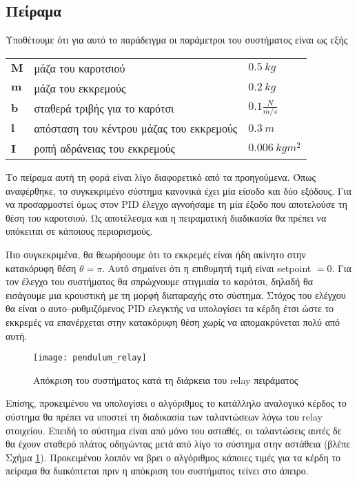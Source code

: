 \subsection{Πείραμα}

Υποθέτουμε ότι για αυτό το παράδειγμα οι παράμετροι του συστήματος είναι ως εξής
\begin{flushleft}
\begin{tabular}{lll}
$\mathbf{M}$ & μάζα του καροτσιού & $0.5\ kg$ \\  
$\mathbf{m}$ & μάζα του εκκρεμούς & $0.2\ kg$ \\ 
$\mathbf{b}$ & σταθερά τριβής για το καρότσι & $0.1 \frac{N}{m/s}$ \\ 
$\mathbf{l}$ & απόσταση του κέντρου μάζας του εκκρεμούς & $0.3\ m$ \\ 
$\mathbf{I}$ & ροπή αδράνειας του εκκρεμούς & $0.006\ kgm^2$ \\ 
\end{tabular}
\end{flushleft}
 
Το πείραμα αυτή τη φορά είναι λίγο διαφορετικό από τα προηγούμενα. Όπως αναφέρθηκε, το συγκεκριμένο σύστημα κανονικά έχει μία είσοδο και δύο εξόδους. Για να προσαρμοστεί όμως στον PID έλεγχο αγνοήσαμε τη μία έξοδο που αποτελούσε τη θέση του καροτσιού. Ως αποτέλεσμα και η πειραματική διαδικασία θα πρέπει να υπόκειται σε κάποιους περιορισμούς.

Πιο συγκεκριμένα, θα θεωρήσουμε ότι το εκκρεμές είναι ήδη ακίνητο στην κατακόρυφη θέση $\theta = \pi$. Αυτό σημαίνει ότι η επιθυμητή τιμή είναι setpoint $=0$. Για τον έλεγχο του συστήματος θα σπρώχνουμε στιγμιαία το καρότσι, δηλαδή θα εισάγουμε μια κρουστική με τη μορφή διαταραχής στο σύστημα. Στόχος του ελέγχου θα είναι ο αυτο--ρυθμιζόμενος PID ελεγκτής να υπολογίσει τα κέρδη έτσι ώστε το εκκρεμές να επανέρχεται στην κατακόρυφη θέση χωρίς να απομακρύνεται πολύ από αυτή. 

\begin{figure}[h]
  \centering
  \texttt{[image: pendulum\_relay]}
  \caption{Απόκριση του συστήματος κατά τη διάρκεια του relay πειράματος}
  \label{fig:pendulum_relay}
\end{figure}

Επίσης, προκειμένου να υπολογίσει ο αλγόριθμος το κατάλληλο αναλογικό κέρδος το σύστημα θα πρέπει να υποστεί τη διαδικασία των ταλαντώσεων λόγω του relay στοιχείου. Επειδή το σύστημα είναι από μόνο του ασταθές, οι ταλαντώσεις αυτές δε θα έχουν σταθερό πλάτος οδηγώντας μετά από λίγο το σύστημα στην αστάθεια (βλέπε Σχήμα \ref{fig:pendulum_relay}). Προκειμένου λοιπόν να βρει ο αλγόριθμος κάποιες τιμές για τα κέρδη το πείραμα θα διακόπτεται πριν η απόκριση του συστήματος τείνει στο άπειρο. 



